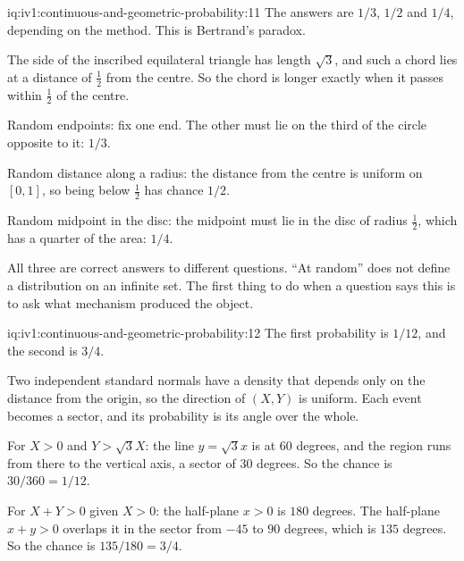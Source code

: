 \begin{solution}{iq:iv1:continuous-and-geometric-probability:11}
The answers are $1/3$, $1/2$ and $1/4$, depending on the method. This is Bertrand's paradox.

The side of the inscribed equilateral triangle has length $\sqrt{3}$, and such a chord lies at a distance of $\tfrac12$ from the centre. So the chord is longer exactly when it passes within $\tfrac12$ of the centre.

Random endpoints: fix one end. The other must lie on the third of the circle opposite to it: $1/3$.

Random distance along a radius: the distance from the centre is uniform on $[0, 1]$, so being below $\tfrac12$ has chance $1/2$.

Random midpoint in the disc: the midpoint must lie in the disc of radius $\tfrac12$, which has a quarter of the area: $1/4$.

All three are correct answers to different questions. ``At random'' does not define a distribution on an infinite set. The first thing to do when a question says this is to ask what mechanism produced the object.

\end{solution}

\begin{solution}{iq:iv1:continuous-and-geometric-probability:12}
The first probability is $1/12$, and the second is $3/4$.

Two independent standard normals have a density that depends only on the distance from the origin, so the direction of $(X, Y)$ is uniform. Each event becomes a sector, and its probability is its angle over the whole.

For $X > 0$ and $Y > \sqrt{3}X$: the line $y = \sqrt{3}x$ is at $60$ degrees, and the region runs from there to the vertical axis, a sector of $30$ degrees. So the chance is $30/360 = 1/12$.

For $X + Y > 0$ given $X > 0$: the half-plane $x > 0$ is $180$ degrees. The half-plane $x + y > 0$ overlaps it in the sector from $-45$ to $90$ degrees, which is $135$ degrees. So the chance is $135/180 = 3/4$.

\end{solution}


